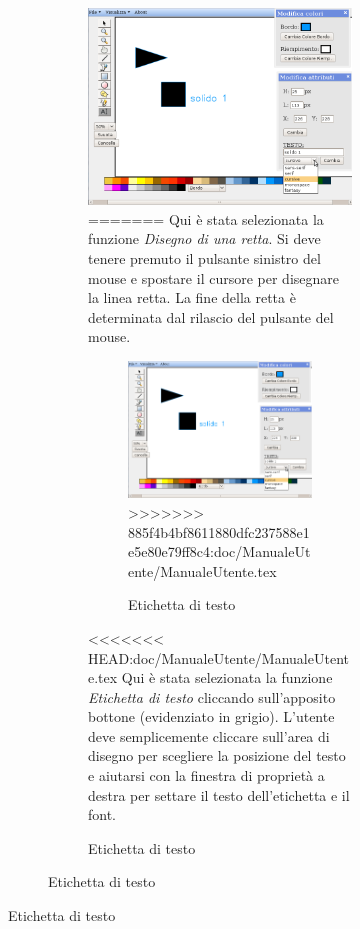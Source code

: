 \begin{figure}[!ht]
\begin{figure}[!ht]
\begin{figure}[!ht]
\centering
\includegraphics[scale=0.4]{images/label.png}
=======
Qui \`e stata selezionata la funzione \textit{Disegno di una retta}. Si deve tenere premuto il pulsante sinistro del mouse e spostare il cursore per disegnare la linea retta. La fine della retta \`e determinata dal rilascio del pulsante del mouse.

\begin{figure}[!ht]
\centering
\includegraphics[scale=1]{images/label.png}
>>>>>>> 885f4b4bf8611880dfc237588e1e5e80e79ff8c4:doc/ManualeUtente/ManualeUtente.tex
\caption{Etichetta di testo}
\end{figure} 

\vspace{300pt}
<<<<<<< HEAD:doc/ManualeUtente/ManualeUtente.tex
Qui \`e stata selezionata la funzione \textit{Etichetta di testo} cliccando sull'apposito bottone (evidenziato in grigio). L'utente deve semplicemente cliccare sull'area di disegno per scegliere la posizione del testo e aiutarsi con la finestra di propriet\`a a destra per settare il testo dell'etichetta e il font. \\
 

\end{figure}
\end{figure}
\end{figure}
